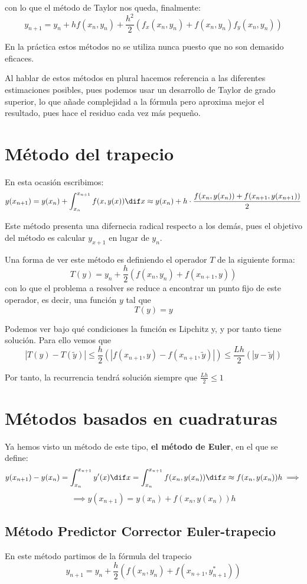 \documentclass{apuntes}
\begin{document}
con lo que el método de Taylor nos queda, finalmente:
\[y_{n+1} = y_n + hf(x_n,y_n)+\frac{h^2}{2}\left(f_x(x_n,y_n)+f(x_n, y_n)f_y(x_n,y_n)\right)\]

\begin{remark}
En la práctica estos métodos no se utiliza nunca puesto que no son demasido eficaces.
\end{remark}

Al hablar de estos métodos en plural hacemos referencia a las diferentes estimaciones posibles, pues podemos usar un desarrollo de Taylor de grado superior, lo que añade complejidad a la fórmula pero aproxima mejor el resultado, pues hace el residuo cada vez más pequeño.


\section{Método del trapecio}
En esta ocasión escribimos:
\[y(x_{n+1})=y(x_n) + \int_{x_n}^{x_{n+1}} f(x,y(x))\dif x \approx y(x_n)+ h\cdot \frac{f(x_n,y(x_n))+f(x_{n+1},y(x_{n+1}))}{2}  \]

Este método presenta una difernecia radical respecto a los demás, pues el objetivo del método es calcular $y_{x+1}$ en lugar de $y_n$.

Una forma de ver este método es definiendo el operador $T$ de la siguiente forma:
\[T(y) = y_n + \frac{h}{2} \left(f(x_n,y_n)+f(x_{n+1}, y) \right)\]
con lo que el problema a resolver se reduce a encontrar un punto fijo de este operador, es decir, una función $y$ tal que
\[T(y)=y\]

Podemos ver bajo qué condiciones la función es Lipchitz y, y por tanto tiene solución. Para ello vemos que
\[|T(y) - T(\tilde{y})| \leq \frac{h}{2} \left( |f(x_{n+1}, y) - f(x_{n+1},\tilde{y})|\right) \leq \frac{Lh}{2}\left( |y-\tilde{y}|\right)\]

Por tanto, la recurrencia tendrá solución siempre que $\frac{Lh}{2} \leq 1$

\section{Métodos basados en cuadraturas}
Ya hemos visto un método de este tipo, \textbf{el método de Euler}, en el que se define:
\[y(x_{n+1}) -y(x_n) = \int_{x_n}^{x_{n+1}} y'(x)\dif x = \int_{x_n}^{x_{n+1}} f(x_n,y(x_n)) \dif x \approx f(x_n,y(x_n))h \implies \]
\[\implies y(x_{n+1}) =y(x_n)+f(x_n,y(x_n))h\]

\subsection{Método Predictor Corrector Euler-trapecio}
En este método partimos de la fórmula del trapecio
\[y_{n+1} = y_n + \frac{h}{2} \left(f(x_n,y_n)+f(x_{n+1}, y^*_{n+1}) \right)\]
\end{document}
